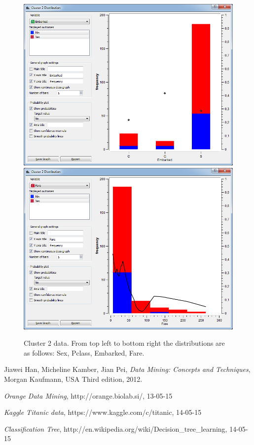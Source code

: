 \documentclass[a4paper,11pt]{article}
\begin{document}
\begin{figure}[h]
\begin{center}
		\includegraphics[scale=0.30]{ClusterDistribution/Cluster2/Embarked}
		\includegraphics[scale=0.30]{ClusterDistribution/Cluster2/Fare}
	\end{center}
	\caption{Cluster 2 data. From top left to bottom right the distributions are as follows: Sex, Pclass, Embarked, Fare.}
	\label{ClusterTwo}
\end{figure}

\begin{thebibliography}{9}

	Jiawei Han, 
	Micheline Kamber, 
	Jian Pei,
	\emph{Data Mining: Concepts and Techniques},
	Morgan Kaufmann, USA	
	Third edition,
	2012.
	

  \emph{Orange Data Mining},
  http://orange.biolab.si/,
  13-05-15
  
	\emph{Kaggle Titanic data},
	https://www.kaggle.com/c/titanic,
	14-05-15
	

	\emph{Classification Tree},
	http://en.wikipedia.org/wiki/Decision\_tree\_learning,
	14-05-15
	
	
	
\end{thebibliography}
\end{document}
